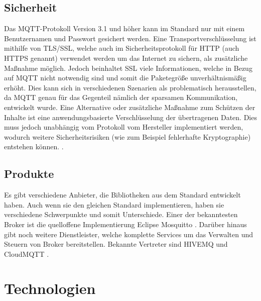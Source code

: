     \subsection{Sicherheit}
        Das \ac{MQTT}-Protokoll Version 3.1 und höher kann im Standard nur mit einem Benutzernamen und Passwort gesichert werden. Eine Transportverschlüsselung ist mithilfe von \ac{TLS}/\ac{SSL}, welche auch im Sicherheitsprotokoll für \acs{HTTP} (auch \acs{HTTPS} genannt) verwendet werden um das Internet zu sichern, als zusätzliche Maßnahme möglich. Jedoch beinhaltet SSL viele Informationen, welche in Bezug auf \ac{MQTT} nicht notwendig sind und somit die Paketegröße unverhältnismäßig erhöht.
        Dies kann sich in verschiedenen Szenarien als problematisch herausstellen, da \ac{MQTT} genau für das Gegenteil nämlich der sparsamen Kommunikation, entwickelt wurde.
        Eine Alternative oder zusätzliche Maßnahme zum Schützen der Inhalte ist eine anwendungsbasierte Verschlüsselung der übertragenen Daten. Dies muss jedoch unabhängig vom Protokoll vom Hersteller implementiert werden, wodurch weitere Sicherheitsrisiken (wie zum Beispiel fehlerhafte Kryptographie) entstehen können. \cite{mqtt_org_2019}.

    \subsection{Produkte}
        Es gibt verschiedene Anbieter, die Bibliotheken aus dem Standard entwickelt haben. Auch wenn sie den gleichen Standard implementieren, haben sie verschiedene Schwerpunkte und somit Unterschiede. Einer der bekanntesten Broker ist die quelloffene Implementierung Eclipse Mosquitto \cite{eclipse_foundation_inc_2018}. Darüber hinaus gibt noch weitere Dienstleister, welche komplette Services um das Verwalten und Steuern von Broker bereitstellen. Bekannte Vertreter sind HIVEMQ \cite{hivemq_dc_square_gmbh} und CloudMQTT \cite{84codes_ab_2019}.

\section{Technologien} \label{Technologien}
